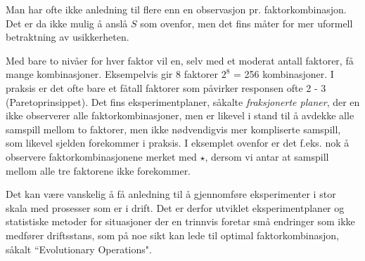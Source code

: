 Man har ofte ikke anledning til flere enn en observasjon pr. faktorkombinasjon.
Det er da ikke mulig å anslå $S$ som ovenfor, men det fins
måter for mer uformell betraktning av usikkerheten.

Med bare to nivåer for hver faktor vil en, selv med et moderat antall
faktorer, få mange kombinasjoner. Eksempelvis gir 8 faktorer
$2^8$ = 256 kombinasjoner.  I praksis er det ofte bare et fåtall 
faktorer som påvirker responsen ofte 2 - 3 (Paretoprinsippet).
Det fins eksperimentplaner, såkalte {\em fraksjonerte planer}, der en ikke
observerer alle faktorkombinasjoner, men er likevel i stand til å
avdekke alle samspill mellom to faktorer, men ikke nødvendigvis
mer kompliserte samspill, som likevel sjelden forekommer i praksis.
I eksemplet ovenfor er det f.eks. nok å observere faktorkombinasjonene
merket med $\star$, dersom vi antar at samspill mellom alle tre faktorene
ikke forekommer.

Det kan være vanskelig å få anledning til å 
gjennomføre eksperimenter i stor skala med prosesser som er i drift. 
Det er derfor utviklet eksperi\-mentplaner og statistiske metoder for
situasjoner der en trinnvis foretar små endringer som ikke medfører
driftsstans, som på noe sikt kan lede til optimal faktorkombinasjon,
såkalt ``Evolutionary Operations".

